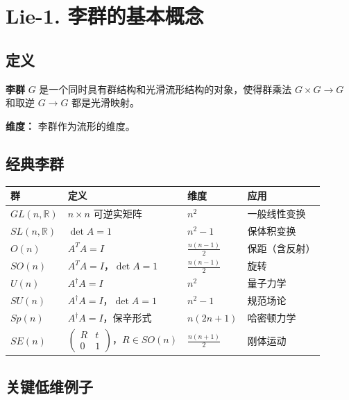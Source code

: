 \section{Lie-1. 李群的基本概念}
\label{sec:lie-group}

\subsection{定义}

\textbf{李群} $G$ 是一个同时具有群结构和光滑流形结构的对象，使得群乘法 $G \times G \to G$ 和取逆 $G \to G$ 都是光滑映射。

\textbf{维度：} 李群作为流形的维度。

\subsection{经典李群}

\begin{center}
\begin{tabular}{L{2cm}L{5cm}L{1.5cm}L{4cm}}
\toprule
\textbf{群} & \textbf{定义} & \textbf{维度} & \textbf{应用} \\
\midrule
$GL(n,\mathbb{R})$ & $n\times n$ 可逆实矩阵 & $n^2$ & 一般线性变换 \\
$SL(n,\mathbb{R})$ & $\det A = 1$ & $n^2 - 1$ & 保体积变换 \\
$O(n)$ & $A^TA = I$ & $\frac{n(n-1)}{2}$ & 保距（含反射） \\
$SO(n)$ & $A^TA = I$，$\det A = 1$ & $\frac{n(n-1)}{2}$ & 旋转 \\
$U(n)$ & $A^\dagger A = I$ & $n^2$ & 量子力学 \\
$SU(n)$ & $A^\dagger A = I$，$\det A = 1$ & $n^2 - 1$ & 规范场论 \\
$Sp(n)$ & $A^\dagger A = I$，保辛形式 & $n(2n+1)$ & 哈密顿力学 \\
$SE(n)$ & $\begin{pmatrix} R & t \\ 0 & 1 \end{pmatrix}$，$R \in SO(n)$ & $\frac{n(n+1)}{2}$ & 刚体运动 \\
\bottomrule
\end{tabular}
\end{center}

\subsection{关键低维例子}

